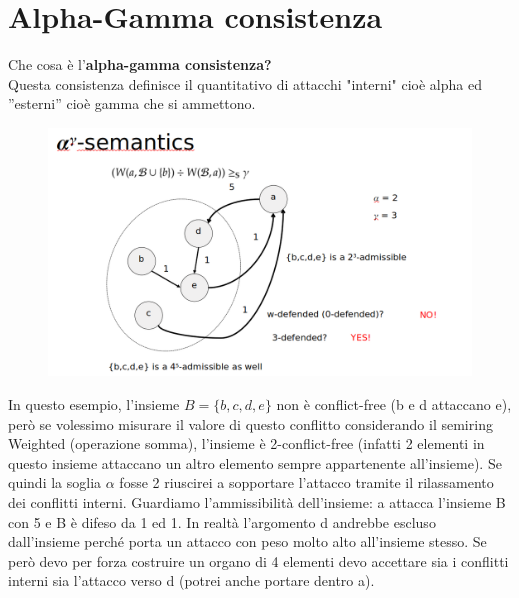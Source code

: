     \section{Alpha-Gamma consistenza}
    Che cosa è l'\textbf{alpha-gamma consistenza?}
    \\ Questa consistenza definisce il quantitativo di attacchi "interni" cioè alpha ed ”esterni” cioè gamma che si ammettono.
    \begin{figure}[H]
        \centering
        \includegraphics[width=12cm, keepaspectratio]{img/Cap6/cons2.png}
    \end{figure}

    In questo esempio, l'insieme $B = \{b, c, d, e\}$ non è conflict-free (b e d attaccano e), però se volessimo misurare il valore di questo conflitto considerando il semiring Weighted (operazione somma), l'insieme è 2-conflict-free (infatti 2 elementi in questo insieme attaccano un altro elemento sempre appartenente all'insieme). Se quindi la soglia $\alpha$ fosse 2 riuscirei a sopportare l'attacco
    tramite il rilassamento dei conflitti interni. Guardiamo l'ammissibilità dell'insieme: a attacca l'insieme B con 5 e B è difeso da 1 ed 1. In realtà l'argomento d andrebbe escluso dall'insieme
    perché porta un attacco con peso molto alto all'insieme stesso. Se però devo per forza costruire un organo di 4 elementi devo accettare sia i conflitti interni sia l'attacco verso d (potrei anche portare dentro a).

